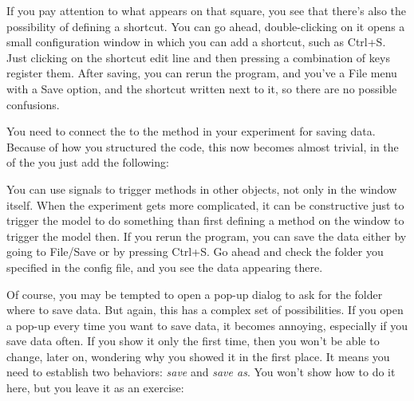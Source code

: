 If you pay attention to what appears on that square, you see that there's also the possibility of defining a shortcut. You can go ahead, double-clicking on it opens a small configuration window in which you can add a shortcut, such as Ctrl+S. Just clicking on the shortcut edit line and then pressing a combination of keys register them. After saving, you can rerun the program, and you've a File menu with a Save option, and the shortcut written next to it, so there are no possible confusions.

You need to connect the  to the method in your experiment for saving data. Because of how you structured the code, this now becomes almost trivial, in the  of the  you just add the following:


You can use signals to trigger methods in other objects, not only in the window itself. When the experiment gets more complicated, it can be constructive just to trigger the model to do something than first defining a method on the window to trigger the model then. If you rerun the program, you can save the data either by going to File/Save or by pressing Ctrl+S. Go ahead and check the folder you specified in the config file, and you see the data appearing there.


Of course, you may be tempted to open a pop-up dialog to ask for the folder where to save data. But again, this has a complex set of possibilities. If you open a pop-up every time you want to save data, it becomes annoying, especially if you save data often. If you show it only the first time, then you won't be able to change, later on, wondering why you showed it in the first place. It means you need to establish two behaviors: \emph{save} and \emph{save as}. You won't show how to do it here, but you leave it as an exercise:

